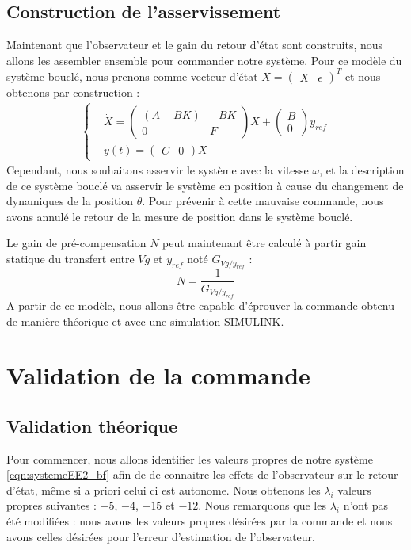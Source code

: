 \subsection{Construction de l'asservissement}
Maintenant que l'observateur et le gain du retour d'état sont construits, nous allons les assembler ensemble pour commander notre système. Pour ce modèle du système bouclé, nous prenons comme vecteur d'état $X=\begin{pmatrix}
X&\epsilon
\end{pmatrix}^T$ et nous obtenons par construction :
\begin{align*}
\label{eqn:systemeEE2_bf}
\left\lbrace
\begin{aligned}
& \dot{X} = \begin{pmatrix}
(A-BK) & -BK\\
0& F
\end{pmatrix}X+\begin{pmatrix}
B\\0
\end{pmatrix}y_{ref} \\
& y(t) = \begin{pmatrix}
C & 0
\end{pmatrix}X
\end{aligned}
\right.
\end{align*} 
Cependant, nous souhaitons asservir le système avec la vitesse $\omega$, et la description de ce système bouclé va asservir le système en position à cause du changement de dynamiques de la position $\theta$. Pour prévenir à cette mauvaise commande, nous avons annulé le retour de la mesure de position dans le système bouclé. 

Le gain de pré-compensation $N$ peut maintenant être calculé à partir gain statique du transfert entre $Vg$ et $y_{ref}$ noté $G_{Vg/y_{ref}}$ : 
\begin{equation}
N = \frac{1}{G_{Vg/y_{ref}}}
\end{equation}
A partir de ce modèle, nous allons être capable d'éprouver la commande obtenu de manière théorique et avec une simulation SIMULINK.

\section{Validation de la commande}
\subsection{Validation théorique}
Pour commencer, nous allons identifier les valeurs propres de notre système \ref{eqn:systemeEE2_bf} afin de de connaitre les effets de l'observateur sur le retour d'état, même si a priori celui ci est autonome. Nous obtenons les $\lambda_i$ valeurs propres suivantes : $-5$, $-4$, $-15$ et $-12$. Nous remarquons que les $\lambda_i$ n'ont pas été modifiées : nous avons les valeurs propres désirées par la commande et nous avons celles désirées pour l'erreur d'estimation de l'observateur. 

